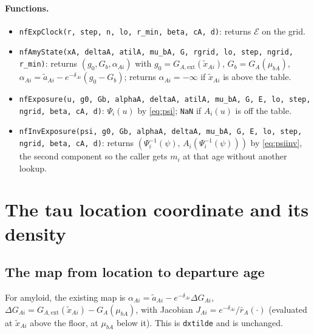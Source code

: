 \documentclass[11pt]{article}
\newcommand{\code}[1]{\texttt{#1}}
\newcommand{\rbar}{\bar r}
\newcommand{\E}{\mathcal{E}}
\begin{document}
\paragraph{Functions.}
\begin{itemize}[nosep]
\item \code{nfExpClock(r, step, n, lo, r\_min, beta, cA, d)}: returns $\E$ on the grid.
\item \code{nfAmyState(xA, deltaA, atilA, mu\_bA, G, rgrid, lo, step, ngrid, r\_min)}:
returns $(g_0, G_b, \alpha_{Ai})$ with $g_0=G_{A,\mathrm{ext}}(\tilde x_{Ai})$,
$G_b=G_A(\mu_{bA})$, $\alpha_{Ai}=\tilde a_{Ai}-e^{-\delta_{Ai}}(g_0-G_b)$; returns
$\alpha_{Ai}=-\infty$ if $\tilde x_{Ai}$ is above the table.
\item \code{nfExposure(u, g0, Gb, alphaA, deltaA, atilA, mu\_bA, G, E, lo, step, ngrid, beta, cA, d)}:
$\Psi_i(u)$ by \eqref{eq:psi}; \code{NaN} if $A_i(u)$ is off the table.
\item \code{nfInvExposure(psi, g0, Gb, alphaA, deltaA, mu\_bA, G, E, lo, step, ngrid, beta, cA, d)}:
returns $(\Psi_i^{-1}(\psi),\,A_i(\Psi_i^{-1}(\psi)))$ by \eqref{eq:psiinv}, the
second component so the caller gets $m_i$ at that age without another lookup.
\end{itemize}

\section{The tau location coordinate and its density}\label{sec:tau-map}

\subsection{The map from location to departure age}

For amyloid, the existing map is $\alpha_{Ai}=\tilde a_{Ai}-e^{-\delta_{Ai}}\Delta G_{Ai}$,
$\Delta G_{Ai}=G_{A,\mathrm{ext}}(\tilde x_{Ai})-G_A(\mu_{bA})$, with Jacobian
$J_{Ai}=e^{-\delta_{Ai}}/\rbar_A(\cdot)$ (evaluated at $\tilde x_{Ai}$ above the
floor, at $\mu_{bA}$ below it). This is \code{dxtilde} and is unchanged.
\end{document}
